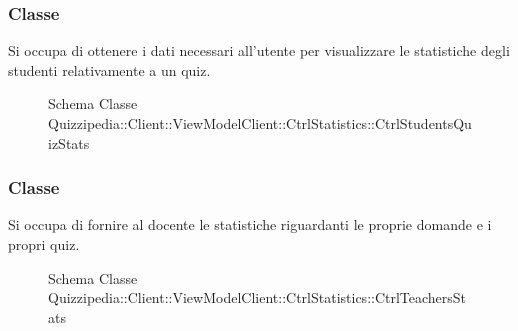 \subsubsection{Classe }
Si occupa di ottenere i dati necessari all'utente per visualizzare le statistiche degli studenti relativamente a un quiz.
\begin{figure}[H]
\centering
\noindent{}
\caption[Schema Classe CtrlStudentsQuizStats]{Schema Classe Quizzipedia::Client::ViewModelClient::CtrlStatistics::CtrlStudentsQuizStats}
\end{figure}
\subsubsection{Classe }
Si occupa di fornire al docente le statistiche riguardanti le proprie domande e i propri quiz.
\begin{figure}[H]
\centering
\noindent{}
\caption[Schema Classe CtrlTeachersStats]{Schema Classe Quizzipedia::Client::ViewModelClient::CtrlStatistics::CtrlTeachersStats}
\end{figure}
